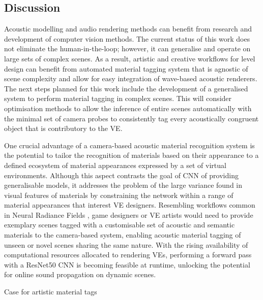 


\subsection{Discussion}
Acoustic modelling and audio rendering methods can benefit from research and development of computer vision methods. 
The current status of this work does not eliminate the human-in-the-loop; however, it can generalise and operate on large sets of complex scenes. As a result, artistic and creative workflows for level design can benefit from automated material tagging system that is agnostic of scene complexity and allow for easy integration of wave-based acoustic renderers.
The next steps planned for this work include the development of a generalised system to perform material tagging in complex scenes. This will consider optimisation methods to allow the inference of entire scenes automatically with the minimal set of camera probes to consistently tag every acoustically congruent object that is contributory to the VE.\par
One crucial advantage of a camera-based acoustic material recognition system is the potential to tailor the recognition of materials based on their appearance to a defined ecosystem of material appearances expressed by a set of virtual environments. Although this aspect contrasts the goal of CNN of providing generalisable models, it addresses the problem of the large variance found in visual features of materials by constraining the network within a range of material appearances that interest VE designers. Resembling workflows common in Neural Radiance Fields \citep{mildenhall2020nerf}, game designers or VE artists would need to provide exemplary scenes tagged with a customisable set of acoustic and semantic materials to the camera-based system, enabling acoustic material tagging of unseen or novel scenes sharing the same nature. With the rising availability of computational resources allocated to rendering VEs, performing a forward pass with a ResNet50 CNN \citep{he2016deep} is becoming feasible at runtime, unlocking the potential for online sound propagation on dynamic scenes.\par

Case for artistic material tags


